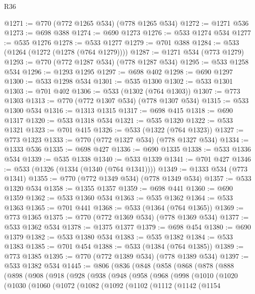 \begin{lexlean}{R36}
\begin{coremodule}
@1271 := @770 (@772 @1265 @534) (@778 @1265 @534)
@1272 := @1271 @536
@1273 := @698 @388
@1274 := @690 @1273
@1276 := @533 @1274 @534
@1277 := @535 @1276
@1278 := @533 @1277
@1279 := @701 @388
@1284 := @533 (@1264 (@1272 (@1278 (@764 @1279))))
@1287 := @1271 @534 (@773 @1279)
@1293 := @770 (@772 @1287 @534) (@778 @1287 @534)
@1295 := @533 @1258 @534
@1296 := @1293 @1295
@1297 := @698 @402
@1298 := @690 @1297
@1300 := @533 @1298 @534
@1301 := @535 @1300
@1302 := @533 @1301
@1303 := @701 @402
@1306 := @533 (@1302 (@764 @1303))
@1307 := @773 @1303
@1313 := @770 (@772 @1307 @534) (@778 @1307 @534)
@1315 := @533 @1300 @534
@1316 := @1313 @1315
@1317 := @698 @415
@1318 := @690 @1317
@1320 := @533 @1318 @534
@1321 := @535 @1320
@1322 := @533 @1321
@1323 := @701 @415
@1326 := @533 (@1322 (@764 @1323))
@1327 := @773 @1323
@1333 := @770 (@772 @1327 @534) (@778 @1327 @534)
@1334 := @1333 @536
@1335 := @698 @427
@1336 := @690 @1335
@1338 := @533 @1336 @534
@1339 := @535 @1338
@1340 := @533 @1339
@1341 := @701 @427
@1346 := @533 (@1326 (@1334 (@1340 (@764 @1341))))
@1349 := @1333 @534 (@773 @1341)
@1355 := @770 (@772 @1349 @534) (@778 @1349 @534)
@1357 := @533 @1320 @534
@1358 := @1355 @1357
@1359 := @698 @441
@1360 := @690 @1359
@1362 := @533 @1360 @534
@1363 := @535 @1362
@1364 := @533 @1363
@1365 := @701 @441
@1368 := @533 (@1364 (@764 @1365))
@1369 := @773 @1365
@1375 := @770 (@772 @1369 @534) (@778 @1369 @534)
@1377 := @533 @1362 @534
@1378 := @1375 @1377
@1379 := @698 @454
@1380 := @690 @1379
@1382 := @533 @1380 @534
@1383 := @535 @1382
@1384 := @533 @1383
@1385 := @701 @454
@1388 := @533 (@1384 (@764 @1385))
@1389 := @773 @1385
@1395 := @770 (@772 @1389 @534) (@778 @1389 @534)
@1397 := @533 @1382 @534
@1445 := @806
    (@836
      (@848
        (@858
          (@868
            (@878
              (@888
                (@898
                  (@908
                    (@918
                      (@928
                        (@938
                          (@948
                            (@958
                              (@968
                                (@998
                                  (@1010
                                    (@1020
                                      (@1030
                                        (@1060
                                          (@1072
                                            (@1082
                                              (@1092
                                                (@1102
                                                  (@1112
                                                    (@1142
                                                      (@1154

\end{coremodule}
\end{lexlean}
